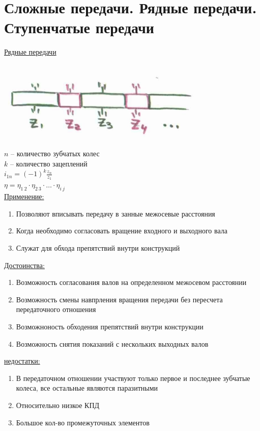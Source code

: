 \documentclass{article}
\begin{document}
\section{Сложные передачи. Рядные передачи. Ступенчатые передачи}

\underline{Рядные передачи}

\includegraphics[width = 0.75\textwidth]{1}

$n$ -- количество зубчатых колес\\
$k$ -- количество зацеплений\\
$i_{1n} = (-1)^k \frac{z_n}{z_1}$\\
$\eta = \eta_{1\:2}\cdot\eta_{2\:3}\cdot\dots\cdot\eta_{i\:j}$\\
\underline{Применение:}
\begin{enumerate}
	\item Позволяют вписывать передачу в занные межосевые расстояния
	\item Когда необходимо согласовать вращение входного и выходного вала
	\item Служат для обхода препятствий внутри конструкций
\end{enumerate}
\underline{Достоинства:} 
\begin{enumerate}
	\item Возможность согласования валов на определенном межосевом расстоянии
	\item Возможность смены навпрления вращения передачи без пересчета передаточного отношения
	\item Возможноность обходения препятствий внутри конструкции
	\item Возможность снятия показаний с нескольких выходных валов
\end{enumerate}
\underline{недостатки:} 
\begin{enumerate}
	\item В передаточном отношении участвуют только первое и последнее зубчатые колеса, все остальные являются паразитными
	\item Относительно низкое КПД
	\item Большое кол-во промежуточных элементов
\end{enumerate}
\end{document}
